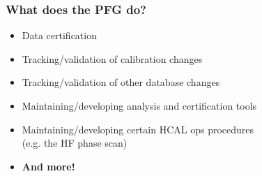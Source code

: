 \documentclass[bigger]{beamer}
\providecommand{\alert}[1]{\textbf{#1}}
\begin{document}
\begin{frame}
\frametitle{What does the PFG do?}
\label{sec-1-1-2}
\begin{itemize}

\item Data certification
\label{sec-1-1-2-1}%

\item Tracking/validation of calibration changes
\label{sec-1-1-2-2}%

\item Tracking/validation of other database changes
\label{sec-1-1-2-3}%

\item Maintaining/developing analysis and certification tools
\label{sec-1-1-2-4}%

\item Maintaining/developing certain HCAL ops procedures\\
\label{sec-1-1-2-5}%
(e.g. the HF phase scan)

\item \alert{And more!}
\label{sec-1-1-2-6}%
\end{itemize} %
\end{frame}
\end{document}
